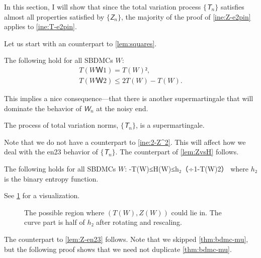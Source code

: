 \documentclass[openany]{amsbook}
\numberwithin{equation}{chapter}
\numberwithin{figure}{chapter}
\numberwithin{table}{chapter}
\def\[#1\]{\begin{equation*}{#1}\end{equation*}}
\theoremstyle{definition}	理dfn:Definition~?s			理exa:Example~?s
\theoremstyle{remark}		理cla:Claim~?s				理rem:Remark~?s
\begin{document}
	In this section, I will show that since the total variation process
	$\{𝘛_n\}$ satisfies almost all properties satisfied by $\{𝘡_n\}$,
	the majority of the proof of \cref{ine:Z-e2pin} applies to \cref{ine:T-e2pin}.
	
	Let us start with an counterpart to \cref{lem:squares}.
	
	\begin{lem}[Evolution of $T$]
		\cite[Lemma~3]{Muramatsu21}
		The following hold for all SBDMCs $W$:
		\begin{gather*}
			T(WＷ1)=T(W)²,			\label{ine:T^2}\\
			T(WＷ2)≤2T(W)-T(W).	\label{ine:2T-T^2}
		\end{gather*}
	\end{lem}
	
	This implies a nice consequence---that there is another supermartingale
	that will dominate the behavior of $𝘞_n$ at the noisy end.
	
	\begin{lem}
		The process of total variation norms, $\{𝘛_n\}$, is a supermartingale.
	\end{lem}
	
	Note that we do not have a counterpart to \cref{ine:2-Z^2}.
	This will affect how we deal with the en23 behavior of $\{𝘛_n\}$.
	The counterpart of \cref{lem:ZvsH} follows.
	
	\begin{lem}[$T$ vs $H$]\label{lem:TvsH}
		\cite[Lemma~4]{Muramatsu21}
		The following holds for all SBDMCs $W$:
		\[1-T(W)≤H(W)≤h₂（÷{1-T(W)}2）\]
		where $h₂$ is the binary entropy function.
	\end{lem}
	
	See \cref{fig:TvsH} for a visualization.
	
	\begin{figure}
		\caption{
			The possible region where $(T(W),Z(W))$ could lie in.
			The curve part is half of $h₂$ after rotating and rescaling.
		}\label{fig:TvsH}
	\end{figure}
	
	The counterpart to \cref{lem:Z-en23} follows.
	Note that we skipped \cref{thm:bdmc-mu}, but the following proof
	shows that we need not duplicate \cref{thm:bdmc-mu}.
	
\end{document}
